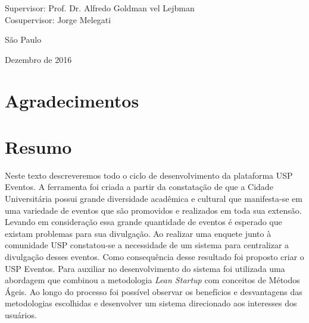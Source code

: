 \documentclass[12pt,twoside,a4paper]{book}
\begin{document}
    \vskip 5cm

    \begin{center}
    Supervisor: Prof. Dr. Alfredo Goldman vel Lejbman\\
    Cosupervisor: Jorge Melegati

    \vskip 5cm
    \normalsize{São Paulo}

    \normalsize{Dezembro de 2016}
    \end{center}
\pagebreak




\chapter*{Agradecimentos}



\chapter*{Resumo}
    \par Neste texto descreveremos todo o ciclo de desenvolvimento da plataforma USP Eventos. A ferramenta foi criada a partir da constatação de que a Cidade Universitária possui grande diversidade acadêmica e cultural que manifesta-se em uma variedade de eventos que são promovidos e realizados em toda sua extensão. Levando em consideração essa grande quantidade de eventos é esperado que existam problemas para sua divulgação. Ao realizar uma enquete junto à comunidade USP constatou-se a necessidade de um sistema para centralizar a divulgação desses eventos. Como consequência desse resultado foi proposto criar o USP Eventos. Para auxiliar no desenvolvimento do sistema foi utilizada uma abordagem que combinou a metodologia \emph{Lean Startup} com conceitos de Métodos Ágeis. Ao longo do processo foi possível observar os benefícios e desvantagens das metodologias escolhidas e desenvolver um sistema direcionado aos interesses dos usuários.
\\
\end{document}
